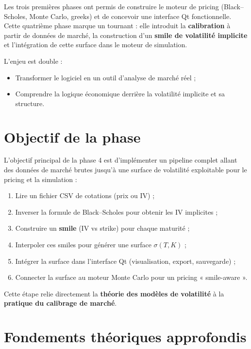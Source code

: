 \documentclass[11pt,a4paper]{article}
\begin{document}
Les trois premières phases ont permis de construire le moteur de pricing (Black–Scholes, Monte Carlo, greeks) et de concevoir une interface Qt fonctionnelle.  
Cette quatrième phase marque un tournant : elle introduit la \textbf{calibration} à partir de données de marché, la construction d’un \textbf{smile de volatilité implicite} et l’intégration de cette surface dans le moteur de simulation.

L’enjeu est double :
\begin{itemize}
  \item Transformer le logiciel en un outil d’analyse de marché réel ;
  \item Comprendre la logique économique derrière la volatilité implicite et sa structure.
\end{itemize}

\clearpage
\section{Objectif de la phase}
L’objectif principal de la phase 4 est d’implémenter un pipeline complet allant des données de marché brutes jusqu’à une surface de volatilité exploitable pour le pricing et la simulation :

\begin{enumerate}
  \item Lire un fichier CSV de cotations (prix ou IV) ;
  \item Inverser la formule de Black–Scholes pour obtenir les IV implicites ;
  \item Construire un \textbf{smile} (IV vs strike) pour chaque maturité ;
  \item Interpoler ces smiles pour générer une surface $\sigma(T,K)$ ;
  \item Intégrer la surface dans l’interface Qt (visualisation, export, sauvegarde) ;
  \item Connecter la surface au moteur Monte Carlo pour un pricing « smile-aware ».
\end{enumerate}

Cette étape relie directement la \textbf{théorie des modèles de volatilité} à la \textbf{pratique du calibrage de marché}.

\section{Fondements théoriques approfondis}
\end{document}
